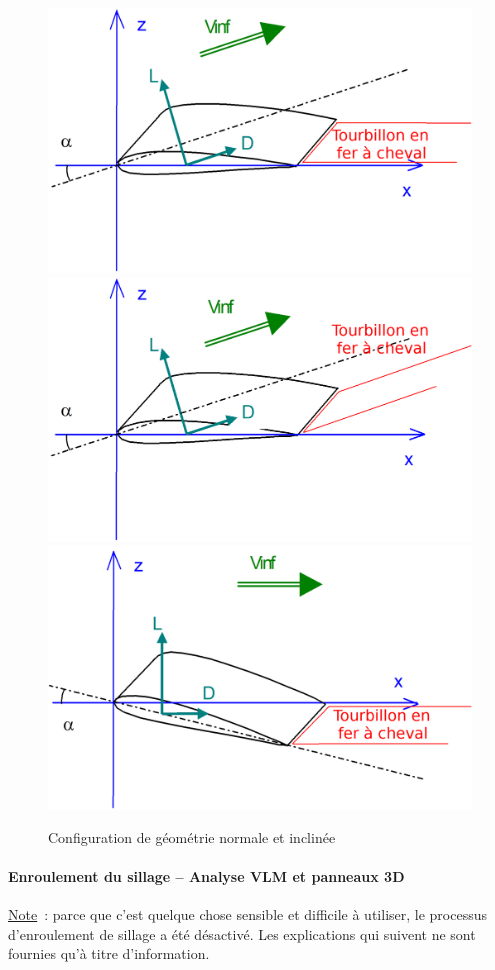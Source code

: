 \documentclass[a4paper,twoside,12pt,dvips]{article}
\begin{document}
\begin{figure}[htbp]
	\includegraphics[width=0.7\linewidth]{img-29-fr}\centering\\
	\includegraphics[width=0.7\linewidth]{img-30-fr}\centering\\
	\includegraphics[width=0.7\linewidth]{img-31-fr}\centering
	\caption{Configuration de géométrie normale et inclinée}
	\label{img:configuration_géométrie_normale_inclinée}
\end{figure}

\clearpage
\paragraph{Enroulement du sillage – Analyse VLM et panneaux 3D}

\underline{Note}~: parce que c’est quelque chose sensible et difficile à utiliser, le processus d’enroulement de sillage a été désactivé. Les explications qui suivent ne sont fournies qu’à titre d’information.
\end{document}
